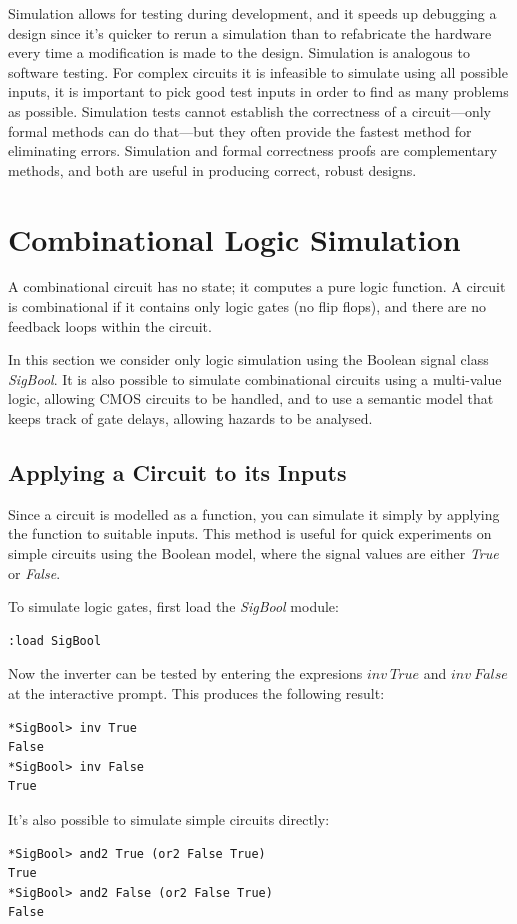 \documentclass[a4paper,openany,fleqn]{book}
\begin{document}
Simulation allows for testing during development, and it speeds up
debugging a design since it's quicker to rerun a simulation than to
refabricate the hardware every time a modification is made to the
design.  Simulation is analogous to software testing. For complex
circuits it is infeasible to simulate using all possible inputs, it is
important to pick good test inputs in order to find as many problems
as possible.  Simulation tests cannot establish the correctness of a
circuit---only formal methods can do that---but they often provide the
fastest method for eliminating errors.  Simulation and formal
correctness proofs are complementary methods, and both are useful in
producing correct, robust designs.

\section{Combinational Logic Simulation}
\label{sec:combinational-logic-simulation}

A combinational circuit has no state; it computes a pure logic
function.  A circuit is combinational if it contains only logic gates
(no flip flops), and there are no feedback loops within the circuit.

In this section we consider only logic simulation using the Boolean
signal class \textit{SigBool}.  It is also possible to simulate
combinational circuits using a multi-value logic, allowing CMOS
circuits to be handled, and to use a semantic model that keeps track
of gate delays, allowing hazards to be analysed.

\subsection{Applying a Circuit to its Inputs}
\label{sec:applying-circuit-inputs}

Since a circuit is modelled as a function, you can simulate it simply
by applying the function to suitable inputs.  This method is useful
for quick experiments on simple circuits using the Boolean model,
where the signal values are either \textit{True} or \textit{False}.

To simulate logic gates, first load the \textit{SigBool} module:
\begin{verbatim}
:load SigBool
\end{verbatim}
Now the inverter can be tested by entering the expresions
$\mathit{inv}\ \textit{True}$ and $\mathit{inv}\ \mathit{False}$ at
the interactive prompt.  This produces the following result:
\begin{verbatim}
*SigBool> inv True
False
*SigBool> inv False
True
\end{verbatim}
It's also possible to simulate simple circuits directly:
\begin{verbatim}
*SigBool> and2 True (or2 False True)
True
*SigBool> and2 False (or2 False True)
False
\end{verbatim}
\end{document}
